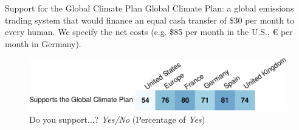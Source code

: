 \documentclass[aspectratio=169,xcolor=dvipsnames, 11pt,mathserif]{beamer}
\begin{document}
\begin{frame}{Support for the Global Climate Plan\label{gcs_support}}
\bbvs 
\ip Global Climate Plan: a global emissions trading system that would finance an equal cash transfer of \$30 per month to every human.
\ip We specify the net costs (e.g. \$85 per month in the U.S., \euro{} per month in Germany).
\ee \vspace{-.3cm}
    \begin{figure}
        \centering %
        \caption{Do you support...? \textit{Yes/No} (Percentage of \textit{Yes}) \hyperlink{gcs_perceptions}{} \hyperlink{conjoint_ab}{} \hyperlink{gcs_vote}{} \hyperlink{national_policies}{}}
        \includegraphics[width=\textwidth]{../figures/country_comparison/gcs_support_positive.pdf} %
    \end{figure}
\end{frame}

\end{document}
